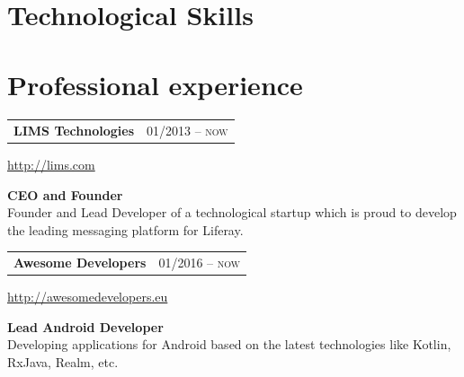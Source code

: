\documentclass[10pt]{article} %
\begin{document}
{\begin{minipage}[t]{0.5\textwidth}
\begin{tabular}{@{}rl@{}}
\end{tabular}\\[10pt]



\section{Technological Skills} 

\end{minipage} %
\hfill
\begin{minipage}[t]{0.44\textwidth} %
\vspace{50pt} %
	
	

\section{Professional experience} 
\medskip

\begin{tabularx}{\textwidth}{@{}Xr@{}}
\large\textbf{LIMS Technologies} & \small\textsc{01/2013 -- now} \\
\end{tabularx}
\normalsize\url{http://lims.com}

\medskip
\normalsize\textbf{CEO and Founder}\\
\small {Founder and Lead Developer of a technological startup which is proud to 
develop the leading messaging platform for Liferay.}\\
\medskip 


\begin{tabularx}{\textwidth}{@{}Xr@{}}
\large\textbf{Awesome Developers} & \small\textsc{01/2016 -- now} \\
\end{tabularx}
\normalsize\url{http://awesomedevelopers.eu}

\medskip
\normalsize\textbf{Lead Android Developer}\\
\small {Developing applications for Android based on the latest \newline technologies like Kotlin, RxJava,
Realm, etc.}\\
\medskip 


\end{minipage}}
\end{document}
